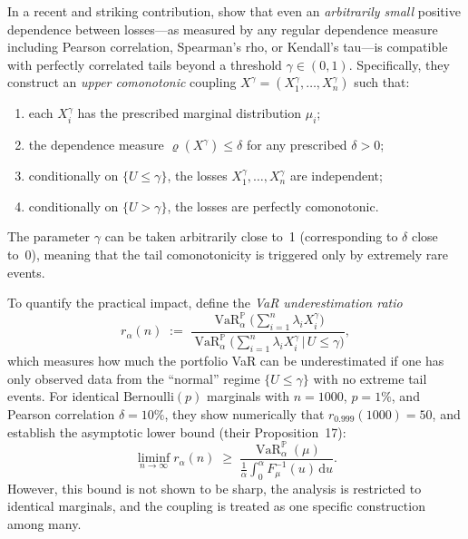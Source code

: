 \documentclass[11pt]{article}
\theoremstyle{definition}
\newcommand{\dd}{\mathrm{d}}
\newcommand{\VaR}{\operatorname{VaR}}
\newcommand{\PP}{\mathbb{P}}
\newcommand{\1}{\mathbf{1}}
\begin{document}
In a recent and striking contribution, \citet{DVNSupper} show that even an \emph{arbitrarily small} positive dependence between losses---as measured by any regular dependence measure including Pearson correlation, Spearman's rho, or Kendall's tau---is compatible with perfectly correlated tails beyond a threshold $\gamma \in (0,1)$. Specifically, they construct an \emph{upper comonotonic} coupling $X^\gamma = (X_1^\gamma, \ldots, X_n^\gamma)$ such that:
\begin{enumerate}[label=(\roman*)]
  \item each $X_i^\gamma$ has the prescribed marginal distribution $\mu_i$;
  \item the dependence measure $\varrho(X^\gamma) \leq \delta$ for any prescribed $\delta > 0$;
  \item conditionally on $\{U \leq \gamma\}$, the losses $X_1^\gamma, \ldots, X_n^\gamma$ are independent;
  \item conditionally on $\{U > \gamma\}$, the losses are perfectly comonotonic.
\end{enumerate}
The parameter $\gamma$ can be taken arbitrarily close to~1 (corresponding to $\delta$ close to~0), meaning that the tail comonotonicity is triggered only by extremely rare events.

To quantify the practical impact, \citet{DVNSupper} define the \emph{VaR underestimation ratio}
\begin{equation}\label{eq:ratio_def}
  r_\alpha(n) \;:=\; \frac{\VaR_\alpha^{\PP}\!\bigl(\sum_{i=1}^n \lambda_i X_i^\gamma\bigr)}
  {\VaR_\alpha^{\PP}\!\bigl(\sum_{i=1}^n \lambda_i X_i^\gamma \,\big|\, U \leq \gamma\bigr)},
\end{equation}
which measures how much the portfolio VaR can be underestimated if one has only observed data from the ``normal'' regime $\{U \leq \gamma\}$ with no extreme tail events. For identical $\mathrm{Bernoulli}(p)$ marginals with $n = 1000$, $p = 1\%$, and Pearson correlation $\delta = 10\%$, they show numerically that $r_{0.999}(1000) = 50$, and establish the asymptotic lower bound (their Proposition~17):
\begin{equation}\label{eq:DVNSlowerbound}
  \liminf_{n \to \infty} r_\alpha(n) \;\geq\; \frac{\VaR_\alpha^\PP(\mu)}{\frac{1}{\alpha}\int_0^\alpha F_\mu^{-1}(u)\,\dd u}.
\end{equation}
However, this bound is not shown to be sharp, the analysis is restricted to identical marginals, and the coupling is treated as one specific construction among many.
\end{document}
